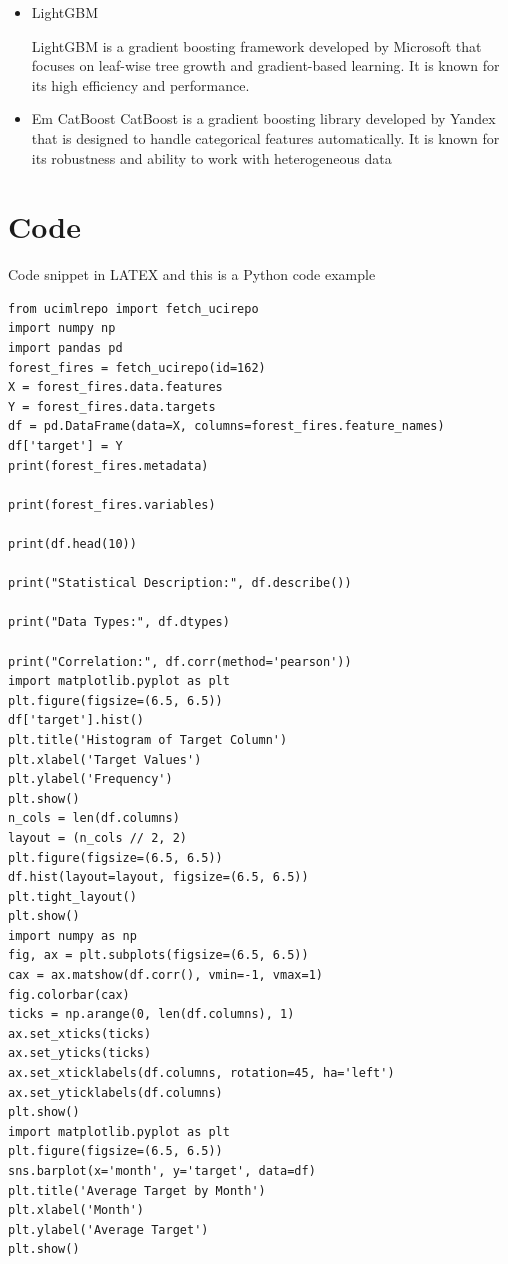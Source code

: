 \begin{itemize}
\item LightGBM

LightGBM is a gradient boosting framework developed by Microsoft that focuses on leaf-wise tree growth and gradient-based learning. It is known for its high efficiency and performance.

\item Em CatBoost
CatBoost is a gradient boosting library developed by Yandex that is designed to handle categorical features automatically. It is known for its robustness and ability to work with heterogeneous data
\end{itemize}


\clearpage
\section{Code}
Code snippet in LATEX and this is a Python code example
\begin{lstlisting}
from ucimlrepo import fetch_ucirepo
import numpy np
import pandas pd
forest_fires = fetch_ucirepo(id=162)
X = forest_fires.data.features
Y = forest_fires.data.targets
df = pd.DataFrame(data=X, columns=forest_fires.feature_names)
df['target'] = Y
print(forest_fires.metadata)

print(forest_fires.variables)

print(df.head(10))

print("Statistical Description:", df.describe())

print("Data Types:", df.dtypes)

print("Correlation:", df.corr(method='pearson'))
import matplotlib.pyplot as plt
plt.figure(figsize=(6.5, 6.5))
df['target'].hist()
plt.title('Histogram of Target Column')
plt.xlabel('Target Values')
plt.ylabel('Frequency')
plt.show()
n_cols = len(df.columns)
layout = (n_cols // 2, 2)
plt.figure(figsize=(6.5, 6.5))
df.hist(layout=layout, figsize=(6.5, 6.5))
plt.tight_layout()
plt.show()
import numpy as np
fig, ax = plt.subplots(figsize=(6.5, 6.5))
cax = ax.matshow(df.corr(), vmin=-1, vmax=1)
fig.colorbar(cax)
ticks = np.arange(0, len(df.columns), 1)
ax.set_xticks(ticks)
ax.set_yticks(ticks)
ax.set_xticklabels(df.columns, rotation=45, ha='left')
ax.set_yticklabels(df.columns)
plt.show()
import matplotlib.pyplot as plt
plt.figure(figsize=(6.5, 6.5))
sns.barplot(x='month', y='target', data=df)
plt.title('Average Target by Month')
plt.xlabel('Month')
plt.ylabel('Average Target')
plt.show()
\end{lstlisting}


